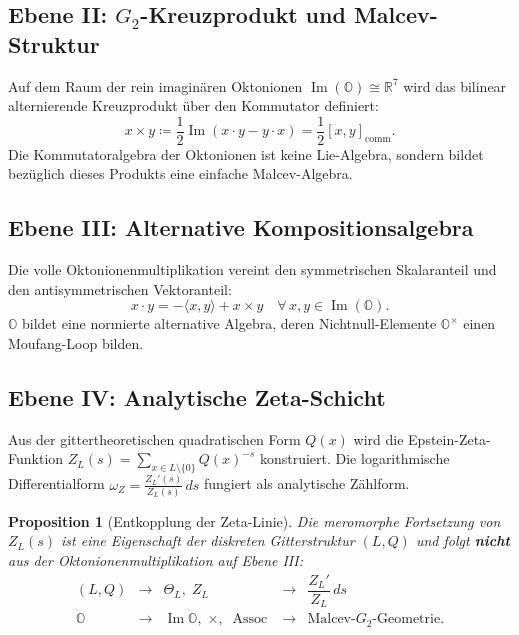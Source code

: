 \documentclass[11pt,a4paper]{article}
\newtheorem{proposition}[theorem]{Proposition}
\theoremstyle{definition}
\newcommand{\Oalg}{\mathbb{O}}
\newcommand{\ImO}{\operatorname{Im}(\mathbb{O})}
\newcommand{\ImPart}{\operatorname{Im}}
\begin{document}
	\subsection{Ebene II: \texorpdfstring{$G_2$}{G2}-Kreuzprodukt und Malcev-Struktur}
	Auf dem Raum der rein imaginären Oktonionen $\ImO \cong \mathbb{R}^7$ wird das bilinear alternierende Kreuzprodukt über den Kommutator definiert:
	\begin{equation}
		x \times y \coloneqq \frac{1}{2} \ImPart(x \cdot y - y \cdot x) = \frac{1}{2} [x, y]_{\mathrm{comm}}.
	\end{equation}
	Die Kommutatoralgebra der Oktonionen ist keine Lie-Algebra, sondern bildet bezüglich dieses Produkts eine einfache Malcev-Algebra.
	
	\subsection{Ebene III: Alternative Kompositionsalgebra}
	Die volle Oktonionenmultiplikation vereint den symmetrischen Skalaranteil und den antisymmetrischen Vektoranteil:
	\begin{equation}
		x \cdot y = -\langle x, y \rangle + x \times y \quad \forall\, x,y \in \ImO.
	\end{equation}
	$\Oalg$ bildet eine normierte alternative Algebra, deren Nichtnull-Elemente $\Oalg^\times$ einen Moufang-Loop bilden.
	
	\subsection{Ebene IV: Analytische Zeta-Schicht}
	Aus der gittertheoretischen quadratischen Form $Q(x)$ wird die Epstein-Zeta-Funktion $Z_L(s) = \sum_{x \in L \setminus \{0\}} Q(x)^{-s}$ konstruiert. Die logarithmische Differentialform $\omega_Z = \frac{Z_L'(s)}{Z_L(s)} \, ds$ fungiert als analytische Zählform.
	
	\begin{proposition}[Entkopplung der Zeta-Linie]
		Die meromorphe Fortsetzung von $Z_L(s)$ ist eine Eigenschaft der diskreten Gitterstruktur $(L, Q)$ und folgt \textbf{nicht} aus der Oktonionenmultiplikation auf Ebene III:
		\begin{equation}
			\begin{array}{ccccc}
				(L, Q) &\longrightarrow& \Theta_L, \; Z_L &\longrightarrow& \dfrac{Z_L'}{Z_L} \, ds \\[2mm]
				\mathbb{O} &\longrightarrow& \operatorname{Im}\mathbb{O}, \; \times, \; \operatorname{Assoc} &\longrightarrow& \text{Malcev-$G_2$-Geometrie}.
			\end{array}
		\end{equation}
	\end{proposition}
	
\end{document}

